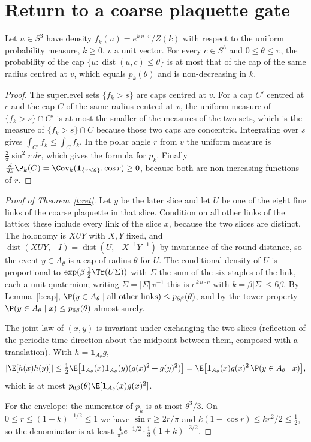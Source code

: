 \section{Return to a coarse plaquette gate}\label{s:ret}
\begin{lemma}\label{l:cap}
Let $u\in S^3$ have density $f_k(u)=e^{k\,u\cdot v}/Z(k)$ with respect to the uniform probability measure,
$k\ge0$, $v$ a unit vector. For every $c\in S^3$ and $0\le\theta\le\pi$, the probability of the cap
$\{u:\operatorname{dist}(u,c)\le\theta\}$ is at most that of the cap of the same radius centred at $v$, which
equals $p_k(\theta)$ and is non-decreasing in $k$.
\end{lemma}
\begin{proof}
The superlevel sets $\{f_k>s\}$ are caps centred at $v$. For a cap $C'$ centred at $c$ and the cap $C$ of the
same radius centred at $v$, the uniform measure of $\{f_k>s\}\cap C'$ is at most the smaller of the measures of
the two sets, which is the measure of $\{f_k>s\}\cap C$ because those two caps are concentric. Integrating
over $s$ gives $\int_{C'}f_k\le\int_Cf_k$. In the polar angle $r$ from $v$ the uniform measure is
$\tfrac2\pi\sin^2r\,dr$, which gives the formula for $p_k$. Finally $\frac{d}{dk}\P_k(C)=
\Cov_k(\mathbf 1_{\{r\le\theta\}},\cos r)\ge0$, because both are non-increasing functions of $r$.
\end{proof}

\begin{proof}[Proof of Theorem~\ref{t:ret}]
Let $y$ be the later slice and let $U$ be one of the eight fine links of the coarse plaquette in that slice.
Condition on all other links of the lattice; these include every link of the slice $x$, because the two
slices are distinct. The holonomy is $XUY$ with $X,Y$ fixed, and $\operatorname{dist}(XUY,-I)=
\operatorname{dist}(U,-X^{-1}Y^{-1})$ by invariance of the round distance, so the event $y\in A_\theta$ is a cap of
radius $\theta$ for $U$. The conditional density of $U$ is proportional to $\exp(\beta\,\tfrac12\Tr(U\Sigma))$
with $\Sigma$ the sum of the six staples of the link, each a unit quaternion; writing $\Sigma=|\Sigma|\,v^{-1}$
this is $e^{k\,u\cdot v}$ with $k=\beta|\Sigma|\le6\beta$. By Lemma~\ref{l:cap},
$\P(y\in A_\theta\mid\text{all other links})\le p_{6\beta}(\theta)$, and by the tower property
$\P(y\in A_\theta\mid x)\le p_{6\beta}(\theta)$ almost surely.

The joint law of $(x,y)$ is invariant under exchanging the two slices (reflection of the periodic time
direction about the midpoint between them, composed with a translation). With $h=\mathbf 1_{A_\theta}g$,
\[
|\E[h(x)h(y)]|\le\tfrac12\E\big[\mathbf 1_{A_\theta}(x)\mathbf 1_{A_\theta}(y)(g(x)^2+g(y)^2)\big]
=\E\big[\mathbf 1_{A_\theta}(x)g(x)^2\,\P(y\in A_\theta\mid x)\big],
\]
which is at most $p_{6\beta}(\theta)\E[\mathbf 1_{A_\theta}(x)g(x)^2]$.

For the envelope: the numerator of $p_k$ is at most $\theta^3/3$. On $0\le r\le(1+k)^{-1/2}\le1$ we have
$\sin r\ge2r/\pi$ and $k(1-\cos r)\le kr^2/2\le\tfrac12$, so the denominator is at least
$\tfrac{4}{\pi^2}e^{-1/2}\cdot\tfrac13(1+k)^{-3/2}$.
\end{proof}

